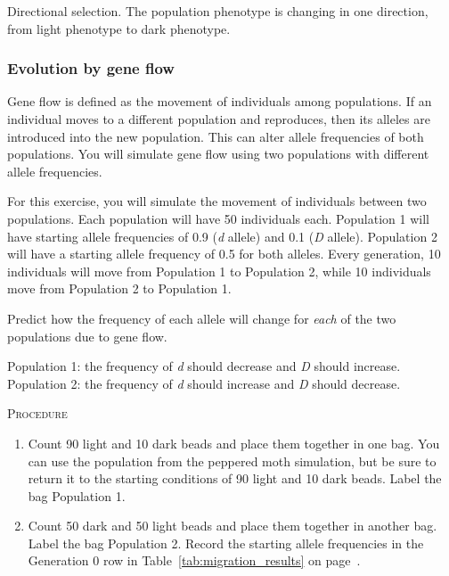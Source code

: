 \documentclass[12pt]{exam}
\newcommand*\AnswerBox[2]{%
    \parbox[t][#1]{0.92\textwidth}{%
    \begin{solution}#2\end{solution}}
    \vspace{\stretch{1}}
}
\newcommand{\allele}[1]{\textit{#1}}
\begin{document}
\begin{questions}
\AnswerBox{0\baselineskip}{Directional selection. The population phenotype is changing in one direction, from light phenotype to dark phenotype.}

\subsubsection*{Evolution by gene flow}

Gene flow is defined as the movement of individuals among populations.  If an individual moves to a different population and reproduces, then its alleles are introduced into the new population.  This can alter allele frequencies of both populations. You will simulate gene flow using two populations with different allele frequencies.

For this exercise, you will simulate the movement of individuals between two populations. Each population will have 50 individuals each. Population 1 will have starting allele frequencies of 0.9 (\allele{d} allele) and 0.1 (\allele{D} allele). Population 2 will have a starting allele frequency of 0.5 for both alleles. Every generation, 10 individuals will move from Population 1 to Population 2, while 10 individuals move from Population 2 to Population 1.

\question\label{ques:migration_prediction}
Predict how the frequency of each allele will change for \emph{each} of the two populations due to gene flow. 

\AnswerBox{3\baselineskip}{Population 1: the frequency of \allele{d} should decrease and \allele{D} should increase. Population 2: the frequency of \allele{d} should increase and \allele{D} should decrease.}

\textsc{Procedure}

\medskip

\begin{enumerate}

	\item Count 90 light and 10 dark beads and place them together in one bag. You can use the population from the peppered moth simulation, but be sure to return it to the starting conditions of 90 light and 10 dark beads. Label the bag Population 1.
	
	\item Count 50 dark and 50 light beads and place them together in another bag. Label the bag Population 2.  Record the starting allele frequencies in the Generation 0 row in Table~\ref{tab:migration_results} on page~\pageref{tab:migration_results}.
	

\end{enumerate}
\end{questions}
\end{document}
